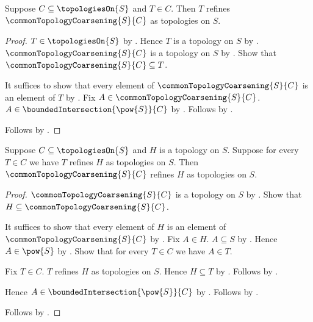 \begin{theorem}\label{members_refine_common_topology_coarsening}
    Suppose $C\subseteq\topologiesOn{S}$ and $T\in C$.
    Then $T$ refines $\commonTopologyCoarsening{S}{C}$
        as topologies on $S$.
\end{theorem}
\begin{proof}
    $T\in\topologiesOn{S}$ by .
    Hence $T$ is a topology on $S$ by
        .
    $\commonTopologyCoarsening{S}{C}$ is a topology on $S$ by
        .
    Show that $\commonTopologyCoarsening{S}{C}\subseteq T$.
    \begin{subproof}
        It suffices to show that every element of
            $\commonTopologyCoarsening{S}{C}$ is an element of $T$ by
            .
        Fix $A\in\commonTopologyCoarsening{S}{C}$.
        $A\in\boundedIntersection{\pow{S}}{C}$ by
            .
        Follows by .
    \end{subproof}
    Follows by .
\end{proof}

\begin{theorem}\label{common_topology_coarsening_greatest}
    Suppose $C\subseteq\topologiesOn{S}$ and $H$ is a topology on $S$.
    Suppose for every $T\in C$ we have
        $T$ refines $H$ as topologies on $S$.
    Then $\commonTopologyCoarsening{S}{C}$ refines $H$
        as topologies on $S$.
\end{theorem}
\begin{proof}
    $\commonTopologyCoarsening{S}{C}$ is a topology on $S$ by
        .
    Show that $H\subseteq\commonTopologyCoarsening{S}{C}$.
    \begin{subproof}
        It suffices to show that every element of $H$ is an element of
            $\commonTopologyCoarsening{S}{C}$ by .
        Fix $A\in H$.
        $A\subseteq S$ by .
        Hence $A\in\pow{S}$ by .
        Show that for every $T\in C$ we have $A\in T$.
        \begin{subproof}
            Fix $T\in C$.
            $T$ refines $H$ as topologies on $S$.
            Hence $H\subseteq T$ by .
            Follows by .
        \end{subproof}
        Hence $A\in\boundedIntersection{\pow{S}}{C}$ by
            .
        Follows by .
    \end{subproof}
    Follows by .
\end{proof}

